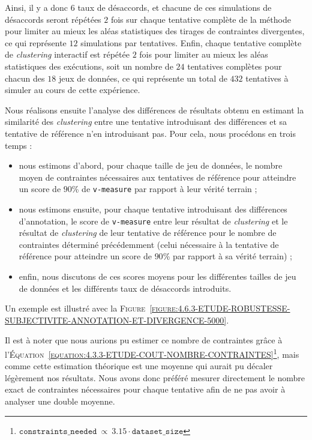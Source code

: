 			Ainsi, il y a donc $6$ taux de désaccords, et chacune de ces simulations de désaccords seront répétées $2$ fois sur chaque tentative complète de la méthode pour limiter au mieux les aléas statistiques des tirages de contraintes divergentes, ce qui représente $12$ simulations par tentatives.
			Enfin, chaque tentative complète de \textit{clustering} interactif est répétée $2$ fois pour limiter au mieux les aléas statistiques des exécutions, soit un nombre de $24$ tentatives complètes pour chacun des $18$ jeux de données, ce qui représente un total de $432$ tentatives à simuler au cours de cette expérience.
			
			Nous réalisons ensuite l'analyse des différences de résultats obtenu en estimant la similarité des \textit{clustering} entre une tentative introduisant des différences et sa tentative de référence n'en introduisant pas.
			Pour cela, nous procédons en trois temps :
			\begin{itemize}
				\item nous estimons d'abord, pour chaque taille de jeu de données, le nombre moyen de contraintes nécessaires aux tentatives de référence pour atteindre un score de $90$\% de \texttt{v-measure} par rapport à leur vérité terrain ;
				\item nous estimons ensuite, pour chaque tentative introduisant des différences d'annotation, le score de \texttt{v-measure} entre leur résultat de \textit{clustering} et le résultat de \textit{clustering} de leur tentative de référence pour le nombre de contraintes déterminé précédemment (celui nécessaire à la tentative de référence pour atteindre un score de $90$\% par rapport à sa vérité terrain) ;
				\item enfin, nous discutons de ces scores moyens pour les différentes tailles de jeu de données et les différents taux de désaccords introduits.
			\end{itemize}
			Un exemple est illustré avec la \textsc{Figure~\ref{figure:4.6.3-ETUDE-ROBUSTESSE-SUBJECTIVITE-ANNOTATION-ET-DIVERGENCE-5000}}.
			
			\begin{leftBarAuthorOpinion}
				Il est à noter que nous aurions pu estimer ce nombre de contraintes grâce à l'\textsc{Équation~\ref{equation:4.3.3-ETUDE-COUT-NOMBRE-CONTRAINTES}}\footnote{
					$\texttt{constraints\_needed}~\propto~3.15 \cdot \texttt{dataset\_size}$
				}, mais comme cette estimation théorique est une moyenne qui aurait pu décaler légèrement nos résultats.
				Nous avons donc préféré mesurer directement le nombre exact de contraintes nécessaires pour chaque tentative afin de ne pas avoir à analyser une double moyenne.
			\end{leftBarAuthorOpinion}
			
